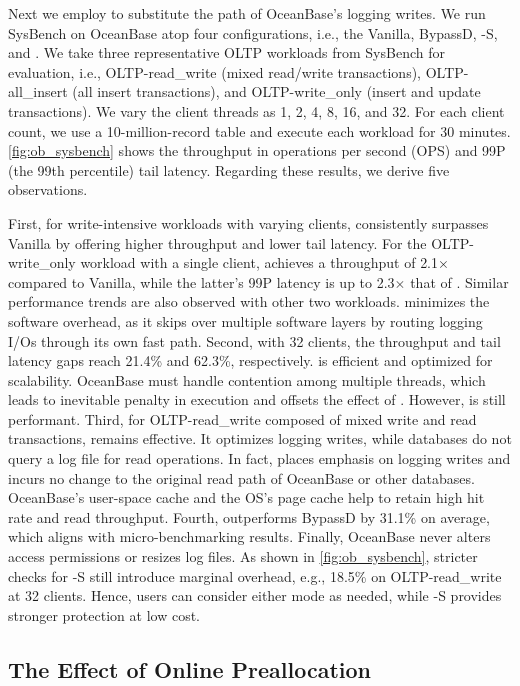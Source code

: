 Next
we employ \odes to substitute the path of OceanBase's logging writes.
We   run SysBench on OceanBase atop four configurations, i.e., the  Vanilla, BypassD, \odes-S, and \odes.
We take three representative OLTP workloads from SysBench for evaluation, i.e., OLTP-read\_write (mixed read/write transactions), OLTP-all\_insert (all insert transactions), and OLTP-write\_only (insert and update transactions).
 We vary the client threads as 1, 2, 4, 8, 16, and 32.
 For each client count, we use a 10-million-record table and execute each workload for 30 minutes.
  \autoref{fig:ob_sysbench}  shows the throughput in operations per second (OPS) and 99P (the 99th percentile) tail latency. Regarding these results, we derive five observations.

First, for write-intensive workloads with varying clients, \odes consistently surpasses Vanilla by offering higher throughput and lower tail latency. For the OLTP-write\_only workload with a single client, \odes achieves a throughput of  {2.1$\times$} compared to   
Vanilla, while the latter's 99P latency is up to {2.3$\times$} that of \odes. Similar performance trends are also observed with   other two workloads. 
\odes  minimizes the software overhead, as it
 skips over multiple software layers by routing logging I/Os through its own fast path.
Second, with 32 clients, the throughput and tail latency gaps reach 21.4\% and 62.3\%, respectively. 
\odes is  efficient and optimized for scalability.
  OceanBase must handle contention among multiple threads, which leads to 
inevitable penalty in execution and offsets the effect of \odes. However, \odes is still performant.
Third, for OLTP-read\_write composed of mixed write and read transactions, \odes remains effective.  It  optimizes logging writes, 
while databases do not query a log file for read operations. In fact,
\odes places emphasis on logging writes and incurs no change to the original read path of OceanBase or other databases.  OceanBase's  user-space cache and the OS's page cache
help to retain high   hit rate and read throughput. 
Fourth, \odes outperforms BypassD by 31.1\% on average, which aligns with micro-benchmarking results. 
Finally,
OceanBase  never alters  access permissions or resizes log files. As shown in \autoref{fig:ob_sysbench}, stricter   checks for \odes-S still introduce  marginal overhead, e.g.,  18.5\% on OLTP-read\_write at 32 clients. 
Hence, users can consider either mode as needed, while \odes-S provides stronger protection at low cost.

\subsection{The Effect of Online Preallocation}\label{sec:eval:preallocation}


